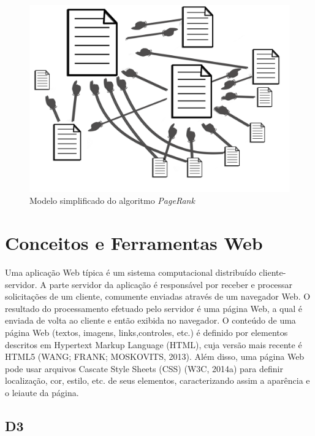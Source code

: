 \begin{figure}[htb]
		\begin{center}
			\includegraphics[width=13cm]{images/pagerankgex.png}
            \caption{Modelo simplificado do algoritmo \textit{PageRank}}
            
	\label{pagerankfig}
		\end{center}
	\end{figure}



\section{Conceitos e Ferramentas Web}

Uma aplicação Web típica é um sistema computacional distribuído cliente-servidor. A parte servidor da aplicação é responsável por receber e processar solicitações de um cliente, comumente enviadas através de um navegador Web. O resultado do processamento efetuado pelo servidor é uma página Web, a qual é enviada de volta ao cliente e então exibida no navegador. O conteúdo de uma página Web (textos, imagens, links,controles, etc.) é definido por elementos descritos em Hypertext Markup Language (HTML), cuja versão mais recente é HTML5 (WANG; FRANK; MOSKOVITS, 2013). Além disso, uma página Web pode usar arquivos Cascate Style Sheets (CSS) (W3C, 2014a) para definir localização, cor, estilo, etc. de seus elementos,
caracterizando assim a aparência e o leiaute da página.

	
\subsection{D3}

